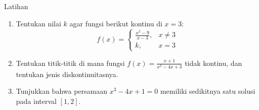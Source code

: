 \documentclass{../../kalkulus-ppt}
\begin{document}
\begin{frame}
    \frametitle{\insertsection}
    \begin{exampleblock}{Latihan}
        \begin{enumerate}
            \item Tentukan nilai $k$ agar fungsi berikut kontinu di $x=3$:
            \[f(x) = \begin{cases}
                \frac{x^2-9}{x-3}, & x \ne 3 \\
                k, & x = 3
            \end{cases}\]
            \item Tentukan titik-titik di mana fungsi $\displaystyle f(x) = \frac{x+1}{x^2-4x+3}$ tidak kontinu, dan tentukan jenis diskontinuitasnya.
            \item Tunjukkan bahwa persamaan $x^3 - 4x + 1 = 0$ memiliki sedikitnya satu solusi pada interval $[1,2]$.
        \end{enumerate}
    \end{exampleblock}
\end{frame}
\end{document}

